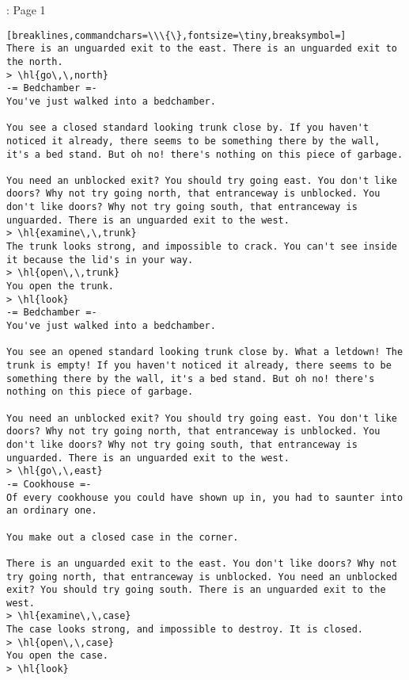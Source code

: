 \begin{AIbox}[width=0.9\textwidth]{\DV: Page 1}
\begin{Verbatim}[breaklines,commandchars=\\\{\},fontsize=\tiny,breaksymbol=]
There is an unguarded exit to the east. There is an unguarded exit to the north.
> \hl{go\,\,north}
-= Bedchamber =-
You've just walked into a bedchamber.

You see a closed standard looking trunk close by. If you haven't noticed it already, there seems to be something there by the wall, it's a bed stand. But oh no! there's nothing on this piece of garbage.

You need an unblocked exit? You should try going east. You don't like doors? Why not try going north, that entranceway is unblocked. You don't like doors? Why not try going south, that entranceway is unguarded. There is an unguarded exit to the west.
> \hl{examine\,\,trunk}
The trunk looks strong, and impossible to crack. You can't see inside it because the lid's in your way.
> \hl{open\,\,trunk}
You open the trunk.
> \hl{look}
-= Bedchamber =-
You've just walked into a bedchamber.

You see an opened standard looking trunk close by. What a letdown! The trunk is empty! If you haven't noticed it already, there seems to be something there by the wall, it's a bed stand. But oh no! there's nothing on this piece of garbage.

You need an unblocked exit? You should try going east. You don't like doors? Why not try going north, that entranceway is unblocked. You don't like doors? Why not try going south, that entranceway is unguarded. There is an unguarded exit to the west.
> \hl{go\,\,east}
-= Cookhouse =-
Of every cookhouse you could have shown up in, you had to saunter into an ordinary one.

You make out a closed case in the corner.

There is an unguarded exit to the east. You don't like doors? Why not try going north, that entranceway is unblocked. You need an unblocked exit? You should try going south. There is an unguarded exit to the west.
> \hl{examine\,\,case}
The case looks strong, and impossible to destroy. It is closed.
> \hl{open\,\,case}
You open the case.
> \hl{look}
\end{Verbatim}
\end{AIbox}
